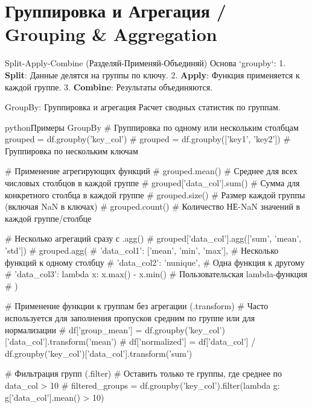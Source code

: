 \section{Группировка и Агрегация / Grouping \& Aggregation}

\begin{myblock}{Split-Apply-Combine (Разделяй-Применяй-Объединяй)}
Основа `groupby`: 1. \textbf{Split}: Данные делятся на группы по ключу. 2. \textbf{Apply}: Функция применяется к каждой группе. 3. \textbf{Combine}: Результаты объединяются.
\end{myblock}

\begin{textbox}{GroupBy: Группировка и агрегация}
Расчет сводных статистик по группам.
\begin{codebox}{python}{Примеры GroupBy}
# Группировка по одному или нескольким столбцам
grouped = df.groupby('key_col')
# grouped = df.groupby(['key1', 'key2']) # Группировка по нескольким ключам

# Применение агрегирующих функций
# grouped.mean() # Среднее для всех числовых столбцов в каждой группе
# grouped['data_col'].sum() # Сумма для конкретного столбца в каждой группе
# grouped.size() # Размер каждой группы (включая NaN в ключах)
# grouped.count() # Количество НЕ-NaN значений в каждой группе/столбце

# Несколько агрегаций сразу с .agg()
# grouped['data_col'].agg(['sum', 'mean', 'std'])
# grouped.agg({
#    'data_col1': ['mean', 'min', 'max'], # Несколько функций к одному столбцу
#    'data_col2': 'nunique',             # Одна функция к другому
#    'data_col3': lambda x: x.max() - x.min() # Пользовательская lambda-функция
# })

# Применение функции к группам без агрегации (.transform)
# Часто используется для заполнения пропусков средним по группе или для нормализации
# df['group_mean'] = df.groupby('key_col')['data_col'].transform('mean')
# df['normalized'] = df['data_col'] / df.groupby('key_col')['data_col'].transform('sum')

# Фильтрация групп (.filter)
# Оставить только те группы, где среднее по data_col > 10
# filtered_groups = df.groupby('key_col').filter(lambda g: g['data_col'].mean() > 10)
\end{codebox}
\end{textbox}


